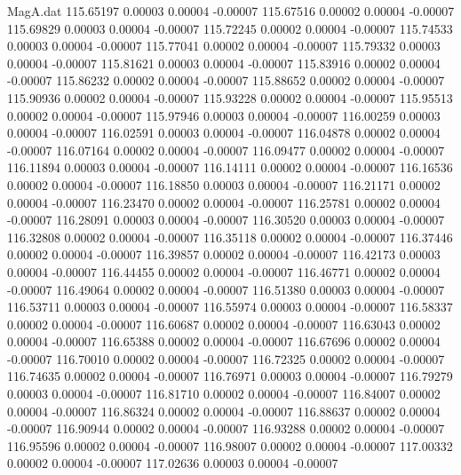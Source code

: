 \begin{filecontents}{MagA.dat}
 115.65197    0.00003    0.00004   -0.00007
 115.67516    0.00002    0.00004   -0.00007
 115.69829    0.00003    0.00004   -0.00007
 115.72245    0.00002    0.00004   -0.00007
 115.74533    0.00003    0.00004   -0.00007
 115.77041    0.00002    0.00004   -0.00007
 115.79332    0.00003    0.00004   -0.00007
 115.81621    0.00003    0.00004   -0.00007
 115.83916    0.00002    0.00004   -0.00007
 115.86232    0.00002    0.00004   -0.00007
 115.88652    0.00002    0.00004   -0.00007
 115.90936    0.00002    0.00004   -0.00007
 115.93228    0.00002    0.00004   -0.00007
 115.95513    0.00002    0.00004   -0.00007
 115.97946    0.00003    0.00004   -0.00007
 116.00259    0.00003    0.00004   -0.00007
 116.02591    0.00003    0.00004   -0.00007
 116.04878    0.00002    0.00004   -0.00007
 116.07164    0.00002    0.00004   -0.00007
 116.09477    0.00002    0.00004   -0.00007
 116.11894    0.00003    0.00004   -0.00007
 116.14111    0.00002    0.00004   -0.00007
 116.16536    0.00002    0.00004   -0.00007
 116.18850    0.00003    0.00004   -0.00007
 116.21171    0.00002    0.00004   -0.00007
 116.23470    0.00002    0.00004   -0.00007
 116.25781    0.00002    0.00004   -0.00007
 116.28091    0.00003    0.00004   -0.00007
 116.30520    0.00003    0.00004   -0.00007
 116.32808    0.00002    0.00004   -0.00007
 116.35118    0.00002    0.00004   -0.00007
 116.37446    0.00002    0.00004   -0.00007
 116.39857    0.00002    0.00004   -0.00007
 116.42173    0.00003    0.00004   -0.00007
 116.44455    0.00002    0.00004   -0.00007
 116.46771    0.00002    0.00004   -0.00007
 116.49064    0.00002    0.00004   -0.00007
 116.51380    0.00003    0.00004   -0.00007
 116.53711    0.00003    0.00004   -0.00007
 116.55974    0.00003    0.00004   -0.00007
 116.58337    0.00002    0.00004   -0.00007
 116.60687    0.00002    0.00004   -0.00007
 116.63043    0.00002    0.00004   -0.00007
 116.65388    0.00002    0.00004   -0.00007
 116.67696    0.00002    0.00004   -0.00007
 116.70010    0.00002    0.00004   -0.00007
 116.72325    0.00002    0.00004   -0.00007
 116.74635    0.00002    0.00004   -0.00007
 116.76971    0.00003    0.00004   -0.00007
 116.79279    0.00003    0.00004   -0.00007
 116.81710    0.00002    0.00004   -0.00007
 116.84007    0.00002    0.00004   -0.00007
 116.86324    0.00002    0.00004   -0.00007
 116.88637    0.00002    0.00004   -0.00007
 116.90944    0.00002    0.00004   -0.00007
 116.93288    0.00002    0.00004   -0.00007
 116.95596    0.00002    0.00004   -0.00007
 116.98007    0.00002    0.00004   -0.00007
 117.00332    0.00002    0.00004   -0.00007
 117.02636    0.00003    0.00004   -0.00007

\end{filecontents}
